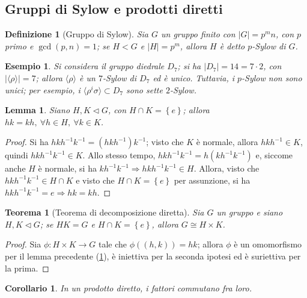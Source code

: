 \documentclass[12pt]{scrartcl}
\theoremstyle{style}
\newtheorem{esempio}{Esempio}[section]
\newtheorem{definizione}{Definizione}[section]
\newtheorem{teorema}{Teorema}[section]
\newtheorem{lemma}{Lemma}[teorema]
\newtheorem{corollario}{Corollario}[teorema]
\numberwithin{equation}{subsection}
\begin{document}
\subsection{Gruppi di Sylow e prodotti diretti}
\begin{definizione}
	[Gruppo di Sylow]
	Sia $G$ un gruppo finito con $\lvert G \rvert = p^m n$, con $p$ primo e $\operatorname{gcd}(p,n) =1$; se $H < G$ e $\lvert H \rvert = p^m$, allora $H$ \`e detto $p$-Sylow di $G$.
\end{definizione}
\begin{esempio}
Si considera il gruppo diedrale $D_7$; si ha $\lvert D_7 \rvert = 14 = 7 \cdot 2$, con $\lvert \langle \rho  \rangle \rvert = 7$; allora $\langle \rho  \rangle$ \`e un $7$-Sylow di $D_7$ ed \`e unico.
Tuttavia, i $p$-Sylow non sono unici; per esempio, i $\langle \rho ^i \sigma \rangle\subset D_7$ sono sette $2$-Sylow.
\end{esempio}
\begin{lemma}\label{lemprec161}
	Siano $H,K\lhd G$, con $H \cap K = \left\{ e \right\} $; allora $hk = kh, \ \forall h\in H, \ \forall k \in K$.
\end{lemma}
	\begin{proof}
		Si ha $hkh^{-1}k^{-1}= (hkh^{-1})k^{-1}$; visto che $K$ \`e normale, allora $hkh^{-1}\in K$, quindi $hkh^{-1}k^{-1}\in K$.
		Allo stesso tempo, $hkh^{-1}k^{-1}= h(kh^{-1}k^{-1})$ e, siccome anche $H$ \`e normale, si ha $kh^{-1}k^{-1}\Rightarrow hkh^{-1}k^{-1}\in H$.
		Allora, visto che $hkh^{-1}k^{-1}\in H\cap K$ e visto che $H\cap K = \left\{ e \right\} $ per assunzione, si ha $hkh^{-1}k^{-1}=e \Rightarrow hk=kh$.
	\end{proof}
\begin{teorema}[Teorema di decomposizione diretta]\label{t171}
	Sia $G$ un gruppo e siano $H,K \lhd G$; se $HK = G$ e $H\cap K = \left\{ e \right\} $, allora $G \cong H \times  K$.
\end{teorema}
	\begin{proof}
		Sia $\phi :H \times  K \to G$ tale che $\phi ((h,k))=hk$; allora $\phi $ \`e un omomorfismo per il lemma precedente (\ref{lemprec161}), \`e iniettiva per la seconda ipotesi ed \`e suriettiva per la prima.
	\end{proof}
\begin{corollario}
	In un prodotto diretto, i fattori commutano fra loro.
\end{corollario}	
\end{document}
